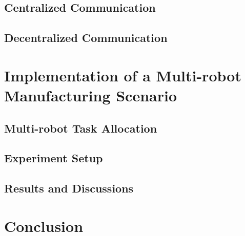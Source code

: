 \documentclass{ifacconf}
\begin{document}
\subsection{Centralized Communication}

\subsection{Decentralized Communication}


\section{Implementation of a Multi-robot Manufacturing Scenario}
\subsection{Multi-robot Task Allocation}


\subsection{Experiment Setup}


\subsection{Results and Discussions}


\section{Conclusion}



                                                   
\end{document}
